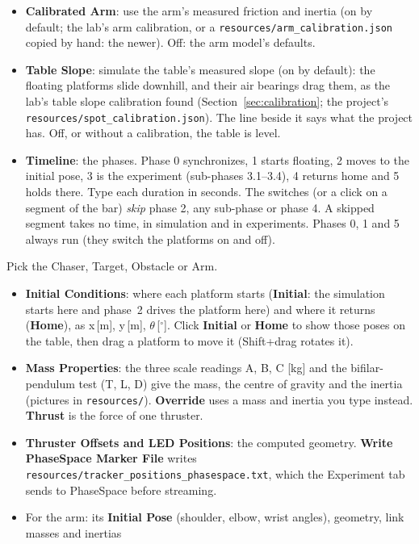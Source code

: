 \documentclass[11pt,a4paper]{article}
\newcommand{\ui}[1]{\textsf{\textbf{#1}}}
\newcommand{\pth}[1]{\texttt{#1}}
\begin{document}
\begin{description}[leftmargin=1em]
\begin{itemize}
      \item \ui{Calibrated Arm}: use the arm's measured friction and inertia (on by default; the lab's arm calibration,
            or a \pth{resources/arm\_calibration.json} copied by hand: the newer). Off: the arm model's defaults.
      \item \ui{Table Slope}: simulate the table's measured slope (on by default): the floating platforms slide
            downhill, and their air bearings drag them, as the lab's table slope calibration found
            (Section~\ref{sec:calibration}; the project's \pth{resources/spot\_calibration.json}). The line beside it says
            what the project has. Off, or without a calibration, the table is level.
      \item \ui{Timeline}: the phases. Phase 0 synchronizes, 1 starts floating, 2 moves to the initial pose, 3 is the
            experiment (sub-phases 3.1--3.4), 4 returns home and 5 holds there.
            Type each duration in seconds. The switches (or a click on a segment of the bar) \emph{skip} phase 2,
            any sub-phase or phase 4. A skipped segment takes no time, in simulation and in experiments.
            Phases 0, 1 and 5 always run (they switch the platforms on and off).
    \end{itemize}
  \item[Platforms.] Pick the Chaser, Target, Obstacle or Arm.
    \begin{itemize}
      \item \ui{Initial Conditions}: where each platform starts (\ui{Initial}: the simulation starts here and phase~2
            drives the platform here) and where it returns (\ui{Home}), as x\,[m], y\,[m], $\theta$\,[$^\circ$].
            Click \ui{Initial} or \ui{Home} to show those poses on the table, then drag a platform to move it
            (Shift+drag rotates it).
      \item \ui{Mass Properties}: the three scale readings A, B, C [kg] and the bifilar-pendulum test (T, L, D) give
            the mass, the centre of gravity and the inertia (pictures in \pth{resources/}).
            \ui{Override} uses a mass and inertia you type instead.
            \ui{Thrust} is the force of one thruster.
      \item \ui{Thruster Offsets and LED Positions}: the computed geometry. \ui{Write PhaseSpace Marker File} writes
            \pth{resources/tracker\_positions\_phasespace.txt}, which the Experiment tab sends to PhaseSpace before streaming.
      \item For the arm: its \ui{Initial Pose} (shoulder, elbow, wrist angles), geometry, link masses and inertias

\end{itemize}
\end{description}
\end{document}
